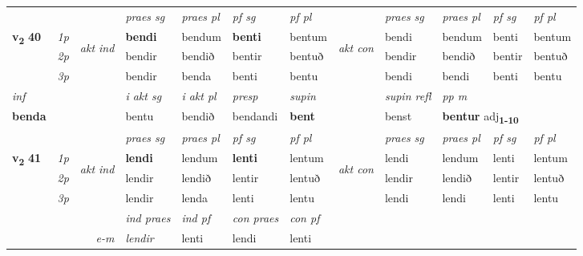 \begin{longtable}[l]{X>{\footnotesize\itshape}llXXXXlXXXX}
 & &   & \textit{praes sg}  & \textit{praes pl}    & \textit{ pf sg} & \textit{pf pl} & & \textit{praes sg}  & \textit{praes pl}    & \textit{pf sg} & \textit{pf pl }  \\ \cmidrule{4-7} \cmidrule{9-12}
 \multirow{2}{*}{{{\textbf{v{\textsubscript{2}}} \Large{\textbf{40}}}}}  & 1p & \multirow{3}{*}{\begin{turn}{90}\textit{akt ind}\end{turn}} & \textbf{bendi} & bendum & \textbf{benti} & bentum & \multirow{3}{*}{\begin{turn}{90}\textit{akt con}\end{turn}} &bendi & bendum & benti & bentum\\*
 & 2p &  &  bendir  & bendið & bentir & bentuð & & bendir & bendið & bentir & bentuð \\*
 & 3p &  & bendir & benda & benti & bentu & & bendi & bendi& benti & bentu \\*
\cmidrule{4-7} \cmidrule{9-12}

   {\textit{inf}} & &  & \textit{i akt sg} & \textit{i akt pl}   & \textit{presp} & \textit{supin} && \textit{supin refl} & \textit{pp m} \\*
  {\textbf{benda}} & && bentu  & bendið   & bendandi &  \textbf{bent} && benst & \multicolumn{2}{l}{\textbf{bentur} adj\textbf{\textsubscript{1-10}}} \\*

\midrule

 & &   & \textit{praes sg}  & \textit{praes pl}    & \textit{ pf sg} & \textit{pf pl} & & \textit{praes sg}  & \textit{praes pl}    & \textit{pf sg} & \textit{pf pl }  \\ \cmidrule{4-7} \cmidrule{9-12}
 \multirow{2}{*}{{{\textbf{v{\textsubscript{2}}} \Large{\textbf{41}}}}}  & 1p & \multirow{3}{*}{\begin{turn}{90}\textit{akt ind}\end{turn}} & \textbf{lendi} & lendum & \textbf{lenti} & lentum & \multirow{3}{*}{\begin{turn}{90}\textit{akt con}\end{turn}} &lendi & lendum & lenti & lentum\\*
 & 2p &  &  lendir  & lendið & lentir & lentuð & & lendir & lendið & lentir & lentuð \\*
 & 3p &  & lendir & lenda & lenti & lentu & & lendi & lendi& lenti & lentu \\*
\cmidrule{4-7} \cmidrule{9-12}

   && &  \textit{ind praes} & \textit{ind pf} & \textit{con praes} & \textit{con pf} \\*
\multicolumn{3}{r}{\textit{e-m}} & lendir & lenti & lendi & lenti \\*


\end{longtable}

